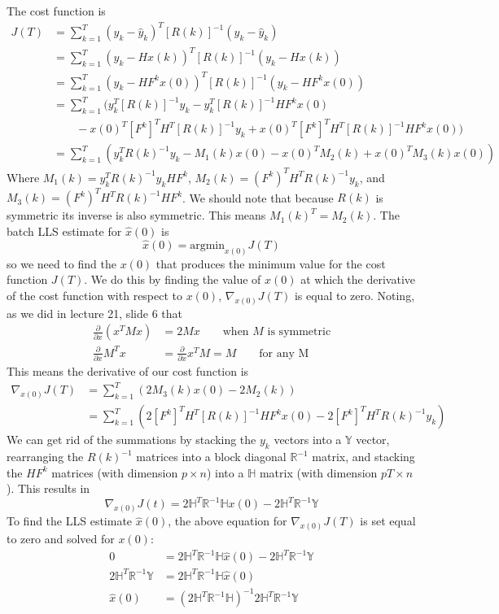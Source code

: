 \documentclass[11pt]{article}
\begin{document}
\subparagraph*{}
The cost function is
\begin{align*}
	J(T) &= \sum_{k=1}^T(y_k-\hat{y}_k)^T[R(k)]^{-1}(y_k-\hat{y}_k) \\
	&= \sum_{k=1}^T(y_k-Hx(k))^T[R(k)]^{-1}(y_k-Hx(k)) \\
	&= \sum_{k=1}^T(y_k-HF^kx(0))^T[R(k)]^{-1}(y_k-HF^kx(0)) \\
	&= \sum_{k=1}^T \Big(y_k^T[R(k)]^{-1}y_k - y_k^T[R(k)]^{-1}HF^kx(0) \\
	&\qquad-x(0)^T[F^k]^TH^T[R(k)]^{-1}y_k + x(0)^T[F^k]^TH^T[R(k)]^{-1}HF^kx(0) \Big) \\
	&= \sum_{k=1}^T (y_k^TR(k)^{-1}y_k - M_1(k)x(0) - x(0)^TM_2(k)+x(0)^TM_3(k)x(0))
\end{align*}
Where $M_1(k) = y_k^TR(k)^{-1}y_kHF^k$, $M_2(k) = (F^k)^TH^TR(k)^{-1}y_k$, and $M_3(k)=(F^k)^TH^TR(k)^{-1}HF^k$. We should note that because $R(k)$ is symmetric its inverse is also symmetric. This means $M_1(k)^T=M_2(k)$. The batch LLS estimate for $\hat{x}(0)$ is
\begin{equation*}
	\hat{x}(0) = \text{argmin}_{x(0)}J(T)
\end{equation*}
so we need to find the $x(0)$ that produces the minimum value for the cost function $J(T)$. We do this by finding the value of $x(0)$ at which the derivative of the cost function with respect to $x(0)$, $\nabla_{x(0)}J(T)$ is equal to zero. Noting, as we did in lecture 21, slide 6 that 
\begin{align*}
	\frac{\partial}{\partial x}(x^TMx) &= 2Mx \qquad \text{when $M$ is symmetric}\\ 
	\frac{\partial}{\partial x}M^Tx &= \frac{\partial}{\partial x}x^TM = M \qquad \text{for any M}
\end{align*}
This means the derivative of our cost function is
\begin{align*}
	\nabla_{x(0)}J(T) &= \sum_{k=1}^T (2M_3(k)x(0)-2M_2(k)) \\
	&= \sum_{k=1}^T (2[F^k]^TH^T[R(k)]^{-1}HF^kx(0)-2[F^k]^TH^TR(k)^{-1}y_k)
\end{align*}
We can get rid of the summations by stacking the $y_k$ vectors into a $\mathbb{Y}$ vector, rearranging the $R(k)^{-1}$ matrices into a block diagonal $\mathbb{R}^{-1}$ matrix, and stacking the $HF^k$ matrices (with dimension $p\times n$) into a $\mathbb{H}$ matrix (with dimension $pT\times n$). This results in 
\begin{equation*}
	\nabla_{x(0)}J(t) = 2\mathbb{H}^T\mathbb{R}^{-1}\mathbb{H}x(0) - 2\mathbb{H}^T\mathbb{R}^{-1}\mathbb{Y}
\end{equation*}
To find the LLS estimate $\hat{x}(0)$, the above equation for $\nabla_{x(0)}J(T)$ is set equal to zero and solved for $x(0)$:
\begin{align*}
	0 &= 2\mathbb{H}^T\mathbb{R}^{-1}\mathbb{H}\hat{x}(0)-2\mathbb{H}^T\mathbb{R}^{-1}\mathbb{Y} \\
	2\mathbb{H}^T\mathbb{R}^{-1}\mathbb{Y} &= 2\mathbb{H}^T\mathbb{R}^{-1}\mathbb{H}\hat{x}(0) \\
	\hat{x}(0) &= (2\mathbb{H}^T\mathbb{R}^{-1}\mathbb{H})^{-1}2\mathbb{H}^T\mathbb{R}^{-1}\mathbb{Y}
\end{align*}
\end{document}
